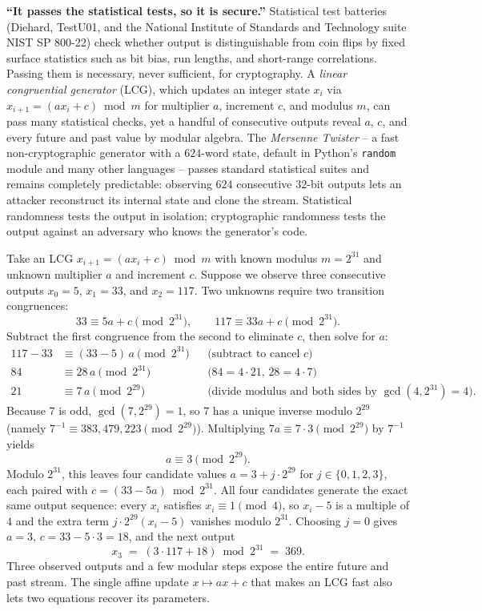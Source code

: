 \begin{trapbox}
\textbf{``It passes the statistical tests, so it is secure.''} Statistical test batteries (Diehard, TestU01, and the National Institute of Standards and Technology suite NIST SP 800-22) check whether output is distinguishable from coin flips by fixed surface statistics such as bit bias, run lengths, and short-range correlations. Passing them is necessary, never sufficient, for cryptography. A \emph{linear congruential generator} (LCG), which updates an integer state $x_i$ via $x_{i+1} = (a x_i + c) \bmod m$ for multiplier $a$, increment $c$, and modulus $m$, can pass many statistical checks, yet a handful of consecutive outputs reveal $a$, $c$, and every future and past value by modular algebra. The \emph{Mersenne Twister} -- a fast non-cryptographic generator with a $624$-word state, default in Python's \texttt{random} module and many other languages -- passes standard statistical suites and remains completely predictable: observing $624$ consecutive $32$-bit outputs lets an attacker reconstruct its internal state and clone the stream. Statistical randomness tests the output in isolation; cryptographic randomness tests the output against an adversary who knows the generator's code.
\end{trapbox}

\begin{example}
\label{ch17:lcg-break}
Take an LCG $x_{i+1} = (a x_i + c) \bmod m$ with known modulus $m = 2^{31}$ and unknown multiplier $a$ and increment $c$. Suppose we observe three consecutive outputs $x_0 = 5$, $x_1 = 33$, and $x_2 = 117$. Two unknowns require two transition congruences:
\[
  33 \equiv 5a + c \pmod{2^{31}}, \qquad 117 \equiv 33a + c \pmod{2^{31}}.
\]
Subtract the first congruence from the second to eliminate $c$, then solve for $a$:
\begin{align*}
  117 - 33 &\equiv (33 - 5)\,a \pmod{2^{31}} && \text{(subtract to cancel $c$)} \\
  84 &\equiv 28\,a \pmod{2^{31}} && \text{($84 = 4 \cdot 21$, $28 = 4 \cdot 7$)} \\
  21 &\equiv 7\,a \pmod{2^{29}} && \text{(divide modulus and both sides by $\gcd(4, 2^{31}) = 4$).}
\end{align*}
Because $7$ is odd, $\gcd(7, 2^{29}) = 1$, so $7$ has a unique inverse modulo $2^{29}$ (namely $7^{-1} \equiv 383{,}479{,}223 \pmod{2^{29}}$). Multiplying $7a \equiv 7 \cdot 3 \pmod{2^{29}}$ by $7^{-1}$ yields
\[
  a \equiv 3 \pmod{2^{29}}.
\]
Modulo $2^{31}$, this leaves four candidate values $a = 3 + j \cdot 2^{29}$ for $j \in \{0, 1, 2, 3\}$, each paired with $c = (33 - 5a) \bmod 2^{31}$. All four candidates generate the exact same output sequence: every $x_i$ satisfies $x_i \equiv 1 \pmod 4$, so $x_i - 5$ is a multiple of $4$ and the extra term $j \cdot 2^{29}(x_i - 5)$ vanishes modulo $2^{31}$. Choosing $j = 0$ gives $a = 3$, $c = 33 - 5 \cdot 3 = 18$, and the next output
\[
  x_3 \;=\; (3 \cdot 117 + 18) \bmod 2^{31} \;=\; 369.
\]
Three observed outputs and a few modular steps expose the entire future and past stream. The single affine update $x \mapsto ax + c$ that makes an LCG fast also lets two equations recover its parameters.
\end{example}

